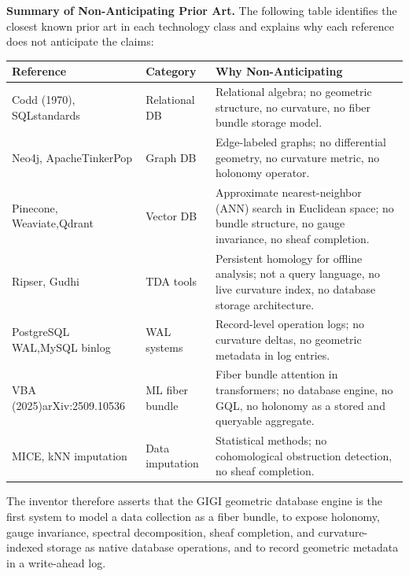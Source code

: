 \documentclass[11pt,letterpaper]{article}
\begin{document}
\textbf{Summary of Non-Anticipating Prior Art.} The following table identifies the closest known prior art in each technology class and explains why each reference does not anticipate the claims:

\begin{center}
\begin{tabular}{@{}p{3.2cm}p{3.4cm}p{7.0cm}@{}}
\toprule
\textbf{Reference} & \textbf{Category} & \textbf{Why Non-Anticipating} \\
\midrule
Codd (1970), SQL\newline standards & Relational DB & Relational algebra; no geometric structure, no curvature, no fiber bundle storage model. \\[4pt]
Neo4j, Apache\newline TinkerPop & Graph DB & Edge-labeled graphs; no differential geometry, no curvature metric, no holonomy operator. \\[4pt]
Pinecone, Weaviate,\newline Qdrant & Vector DB & Approximate nearest-neighbor (ANN) search in Euclidean space; no bundle structure, no gauge invariance, no sheaf completion. \\[4pt]
Ripser, Gudhi & TDA tools & Persistent homology for offline analysis; not a query language, no live curvature index, no database storage architecture. \\[4pt]
PostgreSQL WAL,\newline MySQL binlog & WAL systems & Record-level operation logs; no curvature deltas, no geometric metadata in log entries. \\[4pt]
VBA (2025)\newline arXiv:2509.10536 & ML fiber bundle & Fiber bundle attention in transformers; no database engine, no GQL, no holonomy as a stored and queryable aggregate. \\[4pt]
MICE, kNN imputation & Data imputation & Statistical methods; no cohomological obstruction detection, no sheaf completion. \\
\bottomrule
\end{tabular}
\end{center}

The inventor therefore asserts that the GIGI geometric database engine is the first system to model a data collection as a fiber bundle, to expose holonomy, gauge invariance, spectral decomposition, sheaf completion, and curvature-indexed storage as native database operations, and to record geometric metadata in a write-ahead log.
\end{document}
